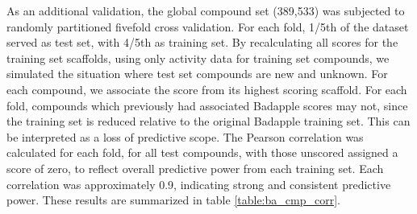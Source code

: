 As an additional validation, the global compound set (389,533) was subjected to randomly partitioned fivefold cross validation. For each fold, 1/5th of the dataset
served as test set, with 4/5th as training set. By recalculating all scores for the training set scaffolds, using only activity data for training set compounds, we
simulated the situation where test set compounds are new and unknown. For each compound, we associate the score from its highest scoring scaffold. For each fold,
compounds which previously had associated Badapple scores may not, since the training set is reduced relative to the original Badapple training set. This can be
interpreted as a loss of predictive scope. The Pearson correlation was calculated for each fold, for all test compounds, with those unscored assigned a score of
zero, to reflect overall predictive power from each training set. Each correlation was approximately 0.9, indicating strong and consistent predictive power. These
results are summarized in table \ref{table:ba_cmp_corr}.


